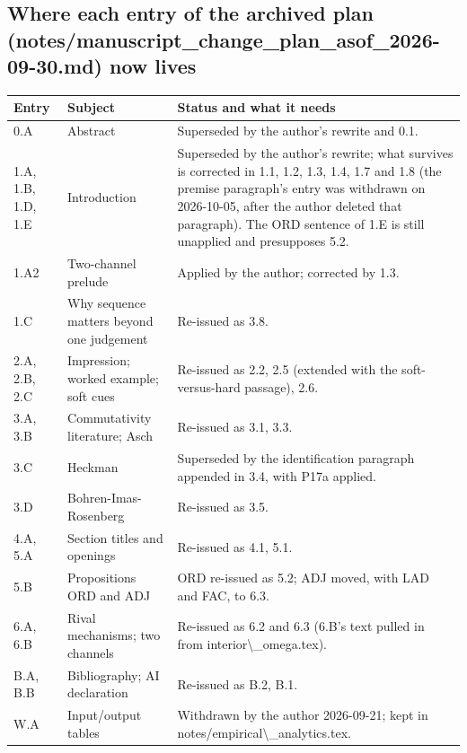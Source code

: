 \documentclass[10pt]{article}
\theoremstyle{definition}
\begin{document}
\subsection*{Where each entry of the archived plan (notes/manuscript\_change\_plan\_asof\_2026-09-30.md) now lives}
{\small
\begin{longtable}{|p{2.6cm}|p{5.2cm}|p{17.4cm}|}
\hline
\textbf{Entry} & \textbf{Subject} & \textbf{Status and what it needs} \\ \hline\endhead
0.A & Abstract & Superseded by the author's rewrite and 0.1. \\ \hline
1.A, 1.B, 1.D, 1.E & Introduction & Superseded by the author's rewrite; what survives is corrected in 1.1, 1.2, 1.3, 1.4, 1.7 and 1.8 (the premise paragraph's entry was withdrawn on 2026-10-05, after the author deleted that paragraph). The ORD sentence of 1.E is still unapplied and presupposes 5.2. \\ \hline
1.A2 & Two-channel prelude & Applied by the author; corrected by 1.3. \\ \hline
1.C & Why sequence matters beyond one judgement & Re-issued as 3.8. \\ \hline
2.A, 2.B, 2.C & Impression; worked example; soft cues & Re-issued as 2.2, 2.5 (extended with the soft-versus-hard passage), 2.6. \\ \hline
3.A, 3.B & Commutativity literature; Asch & Re-issued as 3.1, 3.3. \\ \hline
3.C & Heckman & Superseded by the identification paragraph appended in 3.4, with P17a applied. \\ \hline
3.D & Bohren-Imas-Rosenberg & Re-issued as 3.5. \\ \hline
4.A, 5.A & Section titles and openings & Re-issued as 4.1, 5.1. \\ \hline
5.B & Propositions ORD and ADJ & ORD re-issued as 5.2; ADJ moved, with LAD and FAC, to 6.3. \\ \hline
6.A, 6.B & Rival mechanisms; two channels & Re-issued as 6.2 and 6.3 (6.B's text pulled in from interior\textbackslash{}\_omega.tex). \\ \hline
B.A, B.B & Bibliography; AI declaration & Re-issued as B.2, B.1. \\ \hline
W.A & Input/output tables & Withdrawn by the author 2026-09-21; kept in notes/empirical\textbackslash{}\_analytics.tex. \\ \hline
\end{longtable}
}
\end{document}
